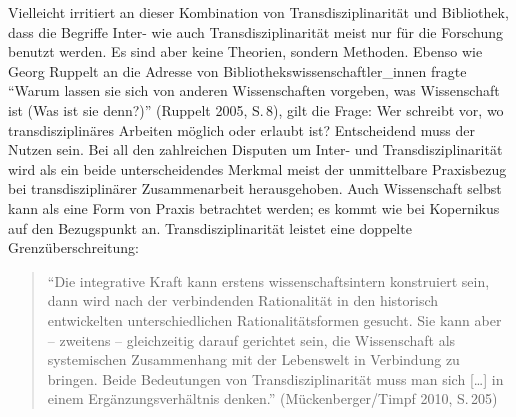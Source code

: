 Vielleicht irritiert an dieser Kombination von Transdisziplinarität und
Bibliothek, dass die Begriffe Inter- wie auch Transdisziplinarität meist
nur für die Forschung benutzt werden. Es sind aber keine Theorien,
sondern Methoden. Ebenso wie Georg Ruppelt an die Adresse von
Bibliothekswissenschaftler\_innen fragte \enquote{Warum lassen sie sich
von anderen Wissenschaften vorgeben, was Wissenschaft ist (Was ist sie
denn?)} (Ruppelt 2005, S.\,8), gilt die Frage: Wer schreibt vor, wo
transdisziplinäres Arbeiten möglich oder erlaubt ist? Entscheidend muss
der Nutzen sein. Bei all den zahlreichen Disputen um Inter- und
Transdisziplinarität wird als ein beide unterscheidendes Merkmal meist
der unmittelbare Praxisbezug bei transdisziplinärer Zusammenarbeit
herausgehoben. Auch Wissenschaft selbst kann als eine Form von Praxis
betrachtet werden; es kommt wie bei Kopernikus auf den Bezugspunkt an.
Transdisziplinarität leistet eine doppelte Grenzüberschreitung:

\begin{quote}
\enquote{Die integrative Kraft kann erstens wissenschaftsintern
konstruiert sein, dann wird nach der verbindenden Rationalität in den
historisch entwickelten unterschiedlichen Rationalitätsformen gesucht.
Sie kann aber -- zweitens -- gleichzeitig darauf gerichtet sein, die
Wissenschaft als systemischen Zusammenhang mit der Lebenswelt in
Verbindung zu bringen. Beide Bedeutungen von Transdisziplinarität muss
man sich {[}\ldots{}{]} in einem Ergänzungsverhältnis denken.}
(Mückenberger/Timpf 2010, S.\,205)
\end{quote}

